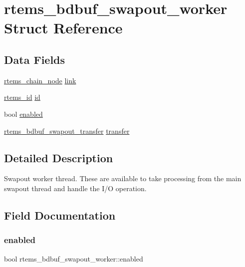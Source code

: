 \hypertarget{structrtems__bdbuf__swapout__worker}{}\section{rtems\+\_\+bdbuf\+\_\+swapout\+\_\+worker Struct Reference}
\label{structrtems__bdbuf__swapout__worker}
\subsection*{Data Fields}
\begin{DoxyCompactItemize}
\item 
\mbox{\hyperlink{structChain__Node__struct}{rtems\+\_\+chain\+\_\+node}} \mbox{\hyperlink{structrtems__bdbuf__swapout__worker_a0698e366425c95d0077f68fdf6cf3281}{link}}
\item 
\mbox{\hyperlink{group__ClassicTasks_gab20892b814dced7dd4e5b9bf42becd57}{rtems\+\_\+id}} \mbox{\hyperlink{structrtems__bdbuf__swapout__worker_a9cbb89036dbe3bf0cf894ee87cb0c75f}{id}}
\item 
bool \mbox{\hyperlink{structrtems__bdbuf__swapout__worker_a190531c5f053c867cb7d69925501cdac}{enabled}}
\item 
\mbox{\hyperlink{structrtems__bdbuf__swapout__transfer}{rtems\+\_\+bdbuf\+\_\+swapout\+\_\+transfer}} \mbox{\hyperlink{structrtems__bdbuf__swapout__worker_a2bb005ceaf36d6278bdab8f1b1182343}{transfer}}
\end{DoxyCompactItemize}


\subsection{Detailed Description}
Swapout worker thread. These are available to take processing from the main swapout thread and handle the I/O operation. 

\subsection{Field Documentation}
\mbox{\label{structrtems__bdbuf__swapout__worker_a190531c5f053c867cb7d69925501cdac}} 
\subsubsection{\texorpdfstring{enabled}{enabled}}
{\footnotesize\ttfamily bool rtems\+\_\+bdbuf\+\_\+swapout\+\_\+worker\+::enabled}

